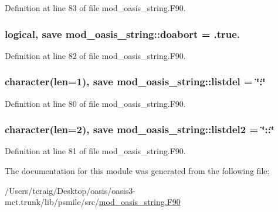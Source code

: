 Definition at line 83 of file mod\+\_\+oasis\+\_\+string.\+F90.

\hypertarget{classmod__oasis__string_a59e9b1145c7c14506941e6495b237395}{
\subsubsection[{doabort}]{\setlength{\rightskip}{0pt plus 5cm}logical, save mod\+\_\+oasis\+\_\+string\+::doabort = .true.\hspace{0.3cm}{\ttfamily [private]}}}\label{classmod__oasis__string_a59e9b1145c7c14506941e6495b237395}


Definition at line 82 of file mod\+\_\+oasis\+\_\+string.\+F90.

\hypertarget{classmod__oasis__string_aa6f905efb4869a52d8bb2414e82bb0a7}{
\subsubsection[{listdel}]{\setlength{\rightskip}{0pt plus 5cm}character(len=1), save mod\+\_\+oasis\+\_\+string\+::listdel = \char`\"{}\+:\char`\"{}\hspace{0.3cm}{\ttfamily [private]}}}\label{classmod__oasis__string_aa6f905efb4869a52d8bb2414e82bb0a7}


Definition at line 80 of file mod\+\_\+oasis\+\_\+string.\+F90.

\hypertarget{classmod__oasis__string_a9b40ad6f4785bd4765a24b6337185513}{
\subsubsection[{listdel2}]{\setlength{\rightskip}{0pt plus 5cm}character(len=2), save mod\+\_\+oasis\+\_\+string\+::listdel2 = \char`\"{}\+::\char`\"{}\hspace{0.3cm}{\ttfamily [private]}}}\label{classmod__oasis__string_a9b40ad6f4785bd4765a24b6337185513}


Definition at line 81 of file mod\+\_\+oasis\+\_\+string.\+F90.



The documentation for this module was generated from the following file\+:\begin{DoxyCompactItemize}
\item 
/\+Users/tcraig/\+Desktop/oasis/oasis3-\/mct.\+trunk/lib/psmile/src/\hyperlink{mod__oasis__string_8_f90}{mod\+\_\+oasis\+\_\+string.\+F90}\end{DoxyCompactItemize}
